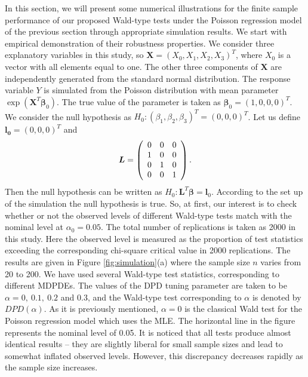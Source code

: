 \documentclass[a4paper]{article}%
\begin{document}
In this section, we will present some numerical illustrations for the finite
sample performance of our proposed Wald-type tests under the Poisson
regression model of the previous section through appropriate simulation results.
We start with empirical demonstration of their  robustness properties. 
We consider three explanatory variables  in this
study, so $\boldsymbol{X} = (X_{0}, X_{1}, X_{2}, X_3)^T$, where $X_{0}$ is a vector with all elements equal to one. 
The other three components of $\boldsymbol{X}$ are independently generated from the standard
normal distribution.
The response variable $Y$ is simulated from the Poisson distribution with mean parameter $\exp(\boldsymbol{X}^T \boldsymbol{\beta}_0)$.
The true value of the parameter is taken as
$\boldsymbol{\beta}_{0}=(1,0,0,0)^{T}$. We consider the null hypothesis as 
$H_{0}:(\beta_{1},\beta_{2},\beta_{3})^{T}=(0,0,0)^{T}$. Let us define $\boldsymbol{l_0}=( 0, 0, 0)^{T}$
and
\[
\boldsymbol{L}=\left(
\begin{array}
[c]{ccc}%
0 & 0 & 0\\
1 & 0 & 0\\
0 & 1 & 0\\
0 & 0 & 1
\end{array}
\right)  .
\]
Then the null hypothesis can be written as
$H_{0}: \boldsymbol{L}^{T} \boldsymbol{\beta} = \boldsymbol{l}_0$. 
According to the set up of the simulation the null hypothesis is true. 
So, at first, our interest is to check whether or not the observed levels of different Wald-type tests match with the nominal level at $\alpha_0 = 0.05$. 
The total number of replications is taken as 2000 in this study. 
Here the observed level is measured as the proportion of test statistics exceeding the corresponding chi-square critical value in 2000  replications. 
The results are given in Figure \ref{fig:simulation}(a) where the sample size $n$ varies from 20 to 200. We have used several Wald-type test
statistics, corresponding to different MDPDEs. 
The values of the DPD tuning parameter are taken to be $\alpha=0,\ 0.1,\ 0.2$ and $0.3$, and the  Wald-type test corresponding to $\alpha$ is denoted by $DPD(\alpha)$. As it is previously mentioned, $\alpha=0$ is the classical Wald test
for the Poisson regression model which uses the MLE. The horizontal line in the figure
represents the nominal level of 0.05. It is noticed that all  tests produce almost identical results -- they are slightly
 liberal for small sample sizes and lead to somewhat inflated
observed levels.  However, this discrepancy decreases rapidly as the sample size increases.
\end{document}
